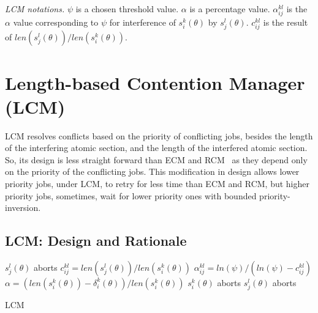 \documentclass[conference]{sig-alternate}
\begin{document}
\textit{LCM notations.} $\psi$ is a chosen threshold value. $\alpha$ is a percentage value. $\alpha_{ij}^{kl}$ is the $\alpha$ value corresponding to $\psi$ for interference of $s_i^k(\theta)$ by $s_j^l(\theta)$. $c_{ij}^{kl}$ is the result of $len(s_j^l(\theta))/len(s_i^k(\theta))$.

\section{Length-based Contention Manager (LCM)}

LCM resolves conflicts based on the priority of conflicting jobs, besides the length of the interfering atomic section, and the length of the interfered atomic section. So, its design is less straight forward than ECM and RCM~\cite{stmconcurrencycontrol:emsoft11} as they depend only on the priority of the conflicting jobs. This modification in design allows lower priority jobs, under LCM, to retry for less time than ECM and RCM, but higher priority jobs, sometimes, wait for lower priority ones with bounded priority-inversion.

\subsection{\label{sec 9.1} LCM: Design and Rationale}

\begin{algorithm}
\LinesNumbered
{}
	{$s_j^l(\theta)$ aborts\label{step_sicommits}\;}
	{$c_{ij}^{kl}=len(s_j^l(\theta))/len(s_i^k(\theta))$\label{step_cijkl}\;
	$\alpha_{ij}^{kl}=ln(\psi)/(ln(\psi)-c_{ij}^{kl})$\label{step_alphaijkl}\;
	$\alpha=\left(len(s_i^k(\theta))-\delta_i^k(\theta)\right)/len(s_i^k(\theta))$\;
	{$s_i^k(\theta)$ aborts\label{step_siaborts}\;}
	{$s_j^l(\theta)$ aborts\label{step_sjaborts}\;}
	}
\caption{LCM}
\label{alg_lcm}
\end{algorithm}
\end{document}
